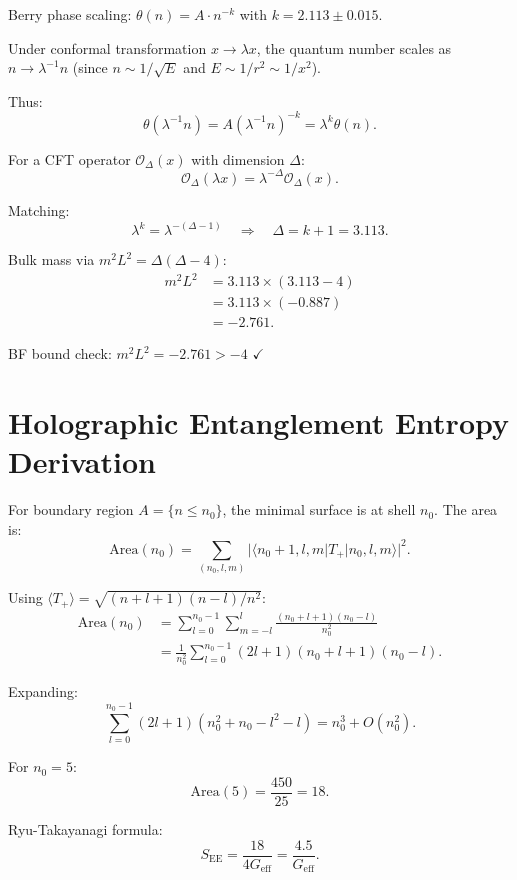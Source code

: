 \documentclass[aps,prd,twocolumn,superscriptaddress,floatfix]{revtex4-2}
\begin{document}
Berry phase scaling: $\theta(n) = A \cdot n^{-k}$ with $k = 2.113 \pm 0.015$.

Under conformal transformation $x \to \lambda x$, the quantum number scales as $n \to \lambda^{-1} n$ (since $n \sim 1/\sqrt{E}$ and $E \sim 1/r^2 \sim 1/x^2$).

Thus:
\begin{equation}
\theta(\lambda^{-1} n) = A (\lambda^{-1} n)^{-k} = \lambda^k \theta(n).
\end{equation}

For a CFT operator $\mathcal{O}_\Delta(x)$ with dimension $\Delta$:
\begin{equation}
\mathcal{O}_\Delta(\lambda x) = \lambda^{-\Delta} \mathcal{O}_\Delta(x).
\end{equation}

Matching:
\begin{equation}
\lambda^k = \lambda^{-(\Delta - 1)} \quad \Rightarrow \quad \Delta = k + 1 = 3.113.
\end{equation}

Bulk mass via $m^2 L^2 = \Delta(\Delta - 4)$:
\begin{align}
m^2 L^2 &= 3.113 \times (3.113 - 4) \\
&= 3.113 \times (-0.887) \\
&= -2.761.
\end{align}

BF bound check: $m^2 L^2 = -2.761 > -4$ $\checkmark$


\section{Holographic Entanglement Entropy Derivation}

For boundary region $A = \{n \leq n_0\}$, the minimal surface is at shell $n_0$. The area is:
\begin{equation}
\text{Area}(n_0) = \sum_{(n_0,l,m)} |\langle n_0+1,l,m | T_+ | n_0,l,m \rangle|^2.
\end{equation}

Using $\langle T_+ \rangle = \sqrt{(n+l+1)(n-l)/n^2}$:
\begin{align}
\text{Area}(n_0) &= \sum_{l=0}^{n_0-1} \sum_{m=-l}^{l} \frac{(n_0+l+1)(n_0-l)}{n_0^2} \\
&= \frac{1}{n_0^2} \sum_{l=0}^{n_0-1} (2l+1)(n_0+l+1)(n_0-l).
\end{align}

Expanding:
\begin{equation}
\sum_{l=0}^{n_0-1} (2l+1)(n_0^2 + n_0 - l^2 - l) = n_0^3 + O(n_0^2).
\end{equation}

For $n_0 = 5$:
\begin{equation}
\text{Area}(5) = \frac{450}{25} = 18.
\end{equation}

Ryu-Takayanagi formula:
\begin{equation}
S_{\text{EE}} = \frac{18}{4G_{\text{eff}}} = \frac{4.5}{G_{\text{eff}}}.
\end{equation}
\end{document}
